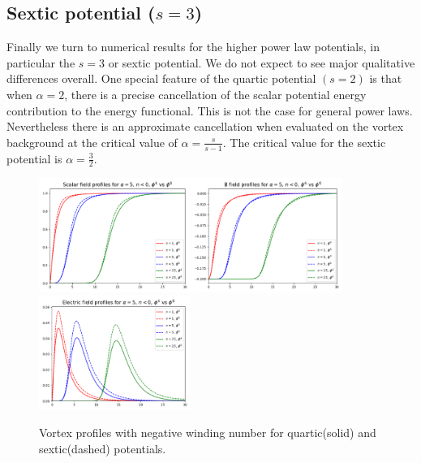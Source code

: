 \subsection{Sextic potential ($s=3$)}
Finally we turn to numerical results for the higher power law potentials, in particular the $s=3$
or sextic potential. We do not expect to see major qualitative differences overall. One special feature of the quartic potential $(s=2)$ is that when $\alpha=2$, there is a precise cancellation of the scalar potential energy contribution to the energy functional. This is not the case for general power laws. Nevertheless there is an approximate cancellation when evaluated on the vortex background at the critical value of $\alpha = \frac{s}{s-1}$.   The critical value for the sextic potential is $\alpha = \frac32$.
\begin{figure}[h]
\begin{center}
 \includegraphics[width=1.95in]{Chapter_2_Folder_1912.11321/figures/f_sixthvsfourth.pdf}\includegraphics[width=1.95in]{Chapter_2_Folder_1912.11321/figures/B_sixthvsfourth.pdf}
 \includegraphics[width=1.95in]{Chapter_2_Folder_1912.11321/figures/E_sixthvsfourth.pdf}
     \caption{{ \small Vortex profiles with negative winding number for quartic(solid) and sextic(dashed) potentials.}} \label{sexticprofile}
    \end{center}
\end{figure}
